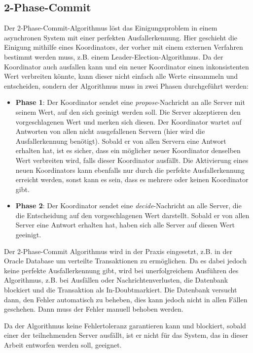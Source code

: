 \subsection{2-Phase-Commit}

Der 2-Phase-Commit-Algorithmus löst das Einigungsproblem in einem asynchronen System mit einer perfekten Ausfallerkennung. Hier geschieht die Einigung mithilfe eines Koordinators, der vorher mit einem externen Verfahren bestimmt werden muss, z.B. einem Leader-Election-Algorithmus. Da der Koordinator auch ausfallen kann und ein neuer Koordinator einen inkonsistenten Wert verbreiten könnte, kann dieser nicht einfach alle Werte einsammeln und entscheiden, sondern der Algorithmus muss in zwei Phasen durchgeführt werden:

\begin{itemize}
	\item \textbf{Phase 1}: Der Koordinator sendet eine \textit{propose}-Nachricht an alle Server mit seinem Wert, auf den sich geeinigt werden soll. Die Server akzeptieren den vorgeschlagenen Wert und merken sich diesen. Der Koordinator wartet auf Antworten von allen nicht ausgefallenen Servern (hier wird die Ausfallerkennung benötigt). Sobald er von allen Servern eine Antwort erhalten hat, ist es sicher, dass ein möglicher neuer Koordinator denselben Wert verbreiten wird, falls dieser Koordinator ausfällt. Die Aktivierung eines neuen Koordinators kann ebenfalls nur durch die perfekte Ausfallerkennung erreicht werden, sonst kann es sein, dass es mehrere oder keinen Koordinator gibt.
	\item \textbf{Phase 2}: Der Koordinator sendet eine \textit{decide}-Nachricht an alle Server, die die Entscheidung auf den vorgeschlagenen Wert darstellt. Sobald er von allen Server eine Antwort erhalten hat, haben sich alle Server auf diesen Wert geeinigt.
\end{itemize}

Der 2-Phase-Commit Algorithmus wird in der Praxis eingesetzt, z.B. in der Oracle Database \cite{oracle-db-2pc} um verteilte Transaktionen zu ermöglichen. Da es dabei jedoch keine perfekte Ausfallerkennung gibt, wird bei unerfolgreichem Ausführen des Algorithmus, z.B. bei Ausfällen oder Nachrichtenverlusten, die Datenbank blockiert und die Transaktion als \glqq In-Doubt\grqq markiert. Die Datenbank versucht dann, den Fehler automatisch zu beheben, dies kann jedoch nicht in allen Fällen geschehen. Dann muss der Fehler manuell behoben werden.

Da der Algorithmus keine Fehlertoleranz garantieren kann und blockiert, sobald einer der teilnehmenden Server ausfällt, ist er nicht für das System, das in dieser Arbeit entworfen werden soll, geeignet. 

